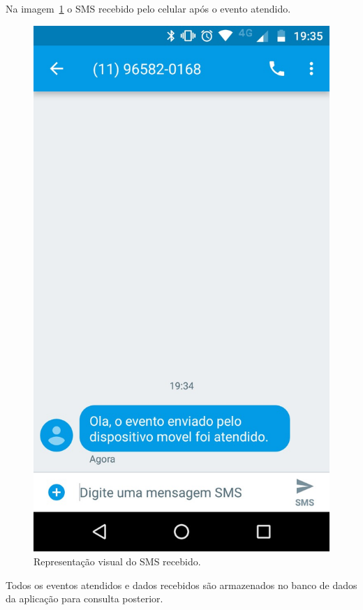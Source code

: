 Na imagem~\ref{fig:smsRecebido2} o SMS recebido pelo celular após o evento atendido.
\begin{figure}[h!]
	\begin{center}
		\includegraphics[width=1.085\textwidth]{./img/smsRecebido2}
		\caption{Representação visual do SMS recebido.}
		\label{fig:smsRecebido2}
	\end{center}
\end{figure}

Todos os eventos atendidos e dados recebidos são armazenados no banco de dados da aplicação para consulta posterior.

